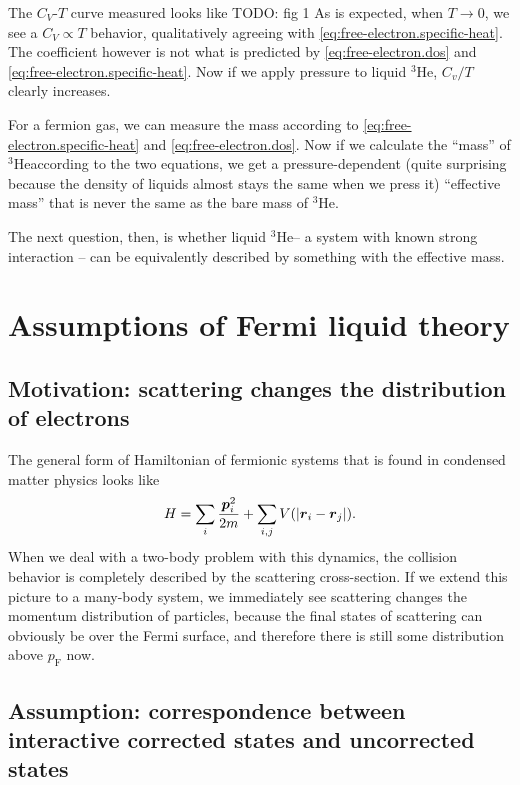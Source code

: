 \documentclass[hyperref, a4paper]{article}
\newcommand*{\pfermi}{p_{\text{F}}}
\newcommand*{\hethree}{$^3$He}
\begin{document}
The $C_V$-$T$ curve measured looks like TODO: fig 1 
As is expected, 
when $T \to 0$, 
we see a $C_V \propto T$ behavior, 
qualitatively agreeing with \eqref{eq:free-electron.specific-heat}.
The coefficient however is not what is predicted by 
\eqref{eq:free-electron.dos} and
\eqref{eq:free-electron.specific-heat}.
Now if we apply pressure to liquid \hethree, 
$C_v / T$ clearly increases. 

For a fermion gas, 
we can measure the mass according to \eqref{eq:free-electron.specific-heat}
and \eqref{eq:free-electron.dos}. 
Now if we calculate the ``mass'' of \hethree according to the two equations, 
we get a pressure-dependent 
(quite surprising because the density of liquids almost stays the same when we press it)
``effective mass''
that is never the same as the bare mass of \hethree.

The next question, then, 
is whether liquid \hethree -- 
a system with known strong interaction -- 
can be equivalently described 
by something with the effective mass. 

\section{Assumptions of Fermi liquid theory}

\subsection{Motivation: scattering changes the distribution of electrons}

The general form of Hamiltonian of fermionic systems 
that is found in condensed matter physics looks like 
\begin{equation}
    H = \sum_i \frac{\vb*{p}_i^2}{2m} + 
    \sum_{i, j} V(\abs{\vb*{r}_i - \vb*{r}_j}).
\end{equation}
When we deal with a two-body problem with this dynamics, 
the collision behavior is completely described
by the scattering cross-section. 
If we extend this picture to a many-body system, 
we immediately see scattering changes 
the momentum distribution of particles, 
because the final states of scattering 
can obviously be over the Fermi surface, 
and therefore there is still some distribution above $\pfermi$ now. 

\subsection{Assumption: correspondence between interactive corrected states and uncorrected states}
\end{document}
